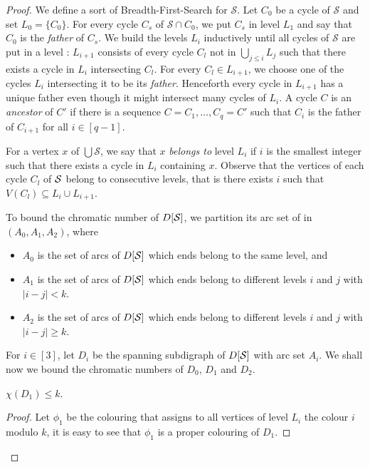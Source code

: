 \documentclass{endm}
\begin{document}
\begin{proof}
We define a sort of Breadth-First-Search for $\mathcal{S}$.
Let $C_0$ be a cycle of $\mathcal{S}$ and set $L_0 = \{C_0\}$. For every cycle $C_s$ of $\mathcal{S}\cap C_0$, we put $C_s$ in level $L_1$ and say that $C_0$ is the \textit{father} of $C_s$. We build  the levels $L_i$ inductively
until all cycles of $\mathcal{S}$ are put in a level : $L_{i+1}$ consists of every cycle $C_l$ not in $\bigcup_{j \leq i} L_j$ such that 
there exists a cycle in $L_i$ intersecting $C_l$.  For every $C_l\in L_{i+1}$, we choose one of the cycles $L_{i}$ intersecting it to be its {\it  father}. Henceforth every cycle in $L_{i+1}$ has a unique  father even though it might intersect many cycles of $L_i$.
A cycle $C$ is an {\it ancestor} of $C'$ if there is a sequence $C=C_1, \dots , C_q=C'$ such that $C_i$ is the father of $C_{i+1}$ for all $i\in [q-1]$.

For a vertex $x$ of $\bigcup \mathcal{S}$, we say that $x$ \textit{belongs to} level $L_i$ if
$i$ is the smallest integer such that there exists a cycle in $L_i$ containing $x$. Observe that the vertices of each cycle $C_l$ of ${\cal S}$ belong to consecutive levels, that is there exists $i$ such that $V(C_l)\subseteq L_i\cup L_{i+1}$.




To bound  the chromatic number of $D[{\cal S}]$, we partition its arc set of in $(A_0,A_1, A_2)$, where
\begin{itemize}
	\item $A_0$ is the set of arcs of $D[{\cal S}]$ which ends belong to the same level, and
	\item $A_1$ is the set of arcs of $D[{\cal S}]$ which ends belong to different levels $i$ and $j$ with $ | i - j| < k$.	
	\item $A_2$ is the set of arcs of $D[{\cal S}]$ which ends belong to different levels $i$ and $j$ with $ | i - j| \geq k$.
\end{itemize} 

For $i\in [3]$, let $D_i$ be the spanning subdigraph of $D[{\cal S}]$ with arc set $A_i$.
We shall now we bound the chromatic numbers of $D_0$, $D_1$ and  $D_2$.


\begin{claim}\label{claim:D1}
$\chi(D_1)\leq k$.
\end{claim}

\begin{proof}
Let $\phi_1$ be the colouring that assigns to all vertices of level $L_i$ the colour $i$ modulo $k$, it 
is easy to see that $\phi_1$ is a proper colouring of $D_1$.
\end{proof}







\end{proof}
\end{document}
